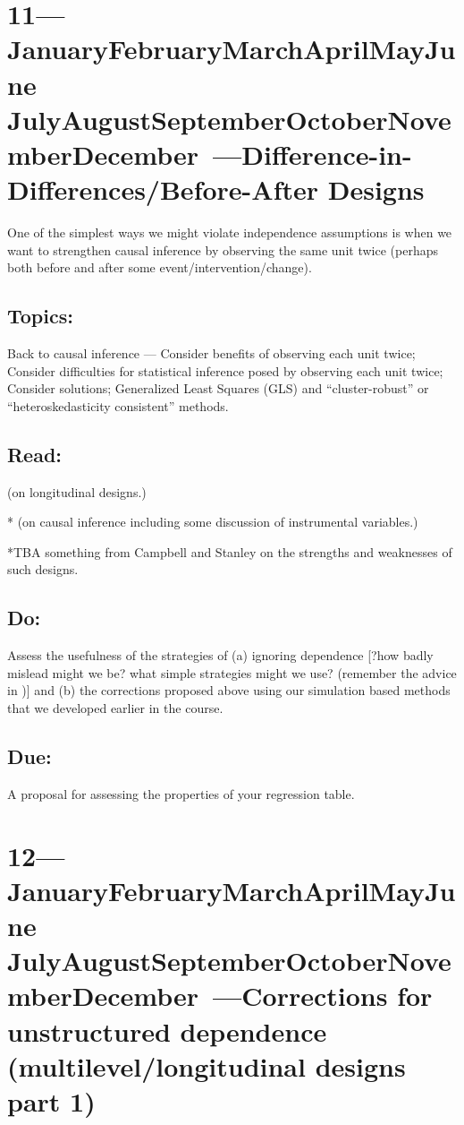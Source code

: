 \documentclass[10pt]{article}
\def\themonth{\ifcase\month\or
  January\or February\or March\or April\or May\or June\or
  July\or August\or September\or October\or November\or December\fi}
\begin{document}
\AdvanceDate[7]
\section{11---\themonth~\the\day---Difference-in-Differences/Before-After Designs}
One of the simplest ways we might violate independence assumptions is
when we want to strengthen causal inference by observing the same unit
twice (perhaps both before and after some event/intervention/change). 

\subsection{Topics:} Back to causal inference --- Consider benefits of
observing each unit twice; Consider difficulties for statistical
inference posed by observing each unit twice; Consider solutions;
Generalized Least Squares (GLS) and ``cluster-robust'' or
``heteroskedasticity consistent'' methods.

\subsection{Read:}
\citealp{bertrand2004msw}

\citealp{allison1990change}

\citealp[Chap 10.7]{gelman2007dau} (on longitudinal designs.)

*\citealp[Chap 9--10]{gelman2007dau} (on causal inference including some discussion of instrumental variables.)

*TBA something from Campbell and Stanley on the strengths and
weaknesses of such designs.

\subsection{Do:} Assess the usefulness of the strategies of (a)
ignoring dependence [?how badly mislead might we be? what simple
strategies might we use? (remember the advice in \citet{achen82})] and
(b) the corrections proposed above using our simulation based methods
that we developed earlier in the course.


\subsection{Due:} A proposal for assessing the properties of your
regression table.

\AdvanceDate[7]
\section{12---\themonth~\the\day---Corrections for unstructured dependence
  (multilevel/longitudinal designs part 1)}
\end{document}
